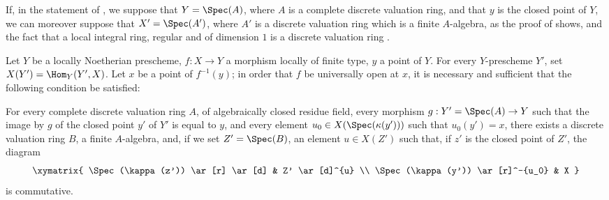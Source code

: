 \begin{remark}[14.5.7]
\label{IV.14.5.7}
If, in the statement of , we suppose that $Y=\Spec(A)$, where $A$ is a complete discrete valuation ring, and that $y$ is the closed point of $Y$, we can moreover suppose that $X'=\Spec(A')$, where $A'$ is a discrete valuation ring which is a finite $A$-algebra, as the proof of  shows, and the fact that a local integral ring, regular and of dimension $1$ is a discrete valuation ring .
\end{remark}

\begin{proposition}[14.5.8]
\label{IV.14.5.8}
Let $Y$ be a locally Noetherian prescheme, $f:X\to Y$ a morphism locally of finite type, $y$ a point of $Y$.
For every $Y$-prescheme $Y'$, set $X(Y')=\Hom_Y(Y',X)$.
Let $x$ be a point of $f^{-1}(y)$; in order that $f$ be universally open at $x$, it is necessary and sufficient that the following condition be satisfied:

For every complete discrete valuation ring $A$, of algebraically closed residue field, every morphism $g:Y'=\Spec(A)\to Y$ such that the image by $g$ of the closed point $y'$ of $Y'$ is equal to $y$, and every element $u_0\in X(\Spec(\kappa(y')))$ such that $u_0(y')=x$, there exists a discrete valuation ring $B$, a finite $A$-algebra, and, if we set $Z'=\Spec(B)$, an element $u\in X(Z')$ such that, if $z'$ is the closed point of $Z'$, the diagram
\[
  \xymatrix{
    \Spec(\kappa(z')) \ar[r] \ar[d] & Z' \ar[d]^{u} \\
    \Spec(\kappa(y')) \ar[r]^-{u_0} & X
  }
\]
is commutative.
\end{proposition}


